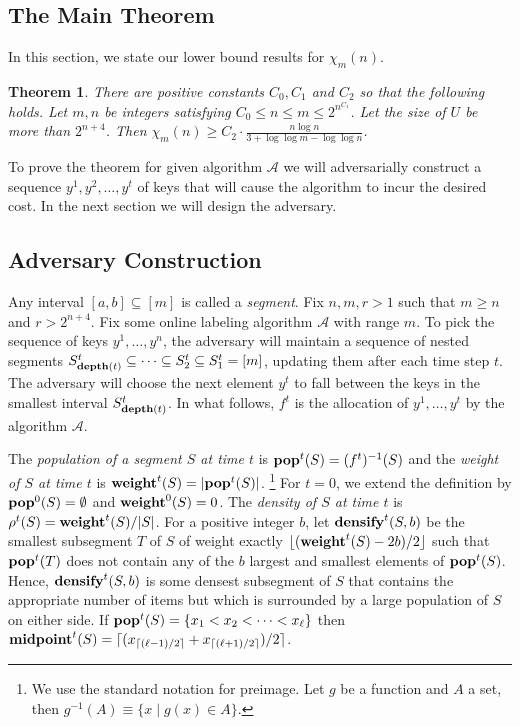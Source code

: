 \documentclass[11pt]{article}
\newtheorem{theorem}{Theorem} %
\newcommand{\A}{\mathcal{A}}
\newcommand{\thmA}{{C_0}}
\newcommand{\thmB}{{C_1}}
\newcommand{\thmC}{{C_2}}
\newcommand{\pop}{{\rm {\bf pop}}}
\newcommand{\weight}{{\rm {\bf weight}}}
\newcommand{\midp}{{\rm {\bf midpoint}}}
\newcommand{\depth}{{\rm {\bf depth}}}
\newcommand{\densify}{{\rm {\bf densify}}}
\begin{document}
\subsection{The Main Theorem}
\label{subsec:main theorem}
In this section, we state our lower bound results for  $\chi_m(n)$.

\begin{theorem}
\label{thm:main}
There are positive constants $\thmA, \thmB$ and $\thmC$ so that the following holds. Let $m,n$ be integers satisfying
$\thmA \leq n \le m \le 2^{n^\thmB}$. Let the size of $U$ be more than $2^{n+4}$.
Then $\chi_m(n) \geq \thmC \cdot \frac{n \log n}{3 + \log \log m - \log \log n}$.
\end{theorem}


To prove the theorem for given algorithm $\A$ we will adversarially construct a sequence $y^1,y^2,\dotsc,y^t$ of keys that will cause
the algorithm to incur the desired cost. In the next section we will design the adversary.

\subsection{Adversary Construction}

Any interval $[a,b]\subseteq [m]$ is called a \emph{segment}. Fix $n,m,r>1$ such that $m\ge n$ and $r>2^{n+4}$.
Fix some online labeling algorithm $\A$ with range $m$.
To pick the sequence of keys $y^1,\dotsc,y^n$, the adversary will maintain a sequence of
nested segments $S^t_{\depth(t)} \subseteq \cdots \subseteq S^t_2 \subseteq S^t_1 = [m]$, updating them after each time step $t$.
The adversary will choose the next element $y^{t}$ to fall between the keys in
the smallest interval $S^t_{\depth(t)}$. In what follows, $f^t$ is the allocation of $y^1,\dotsc,y^t$ by the algorithm $\A$.

The \emph{population of a segment $S$ at time $t$} is $\pop^t(S) = (f^t)^{-1}(S)$ and the
\emph{weight of $S$ at time $t$} is $\weight^t(S) = |\pop^t(S)|$.%
\footnote{We use the standard notation for preimage. Let $g$ be a function and $A$ a set, then $g^{-1}(A) \equiv \{ x \mid g(x) \in A \}$.}
For $t=0$, we extend the definition by $\pop^0(S) = \emptyset$ and $\weight^0(S) = 0$.
The \emph{density of $S$ at time $t$} is $\rho^t(S) = \weight^t(S) / |S|$. For a positive
integer $b$, let $\densify^t(S,b)$ be the smallest subsegment $T$ of $S$ of weight exactly
$\lfloor (\weight^t(S) - 2b) / 2 \rfloor$ such that $\pop^t(T)$ does not contain any of the $b$ largest
and smallest elements of $\pop^t(S)$. Hence, $\densify^t(S,b)$ is some densest subsegment of $S$ that contains
the appropriate number of items but which is surrounded by a large population of $S$ on either side.
If $\pop^t(S)=\{x_1<x_2 <\cdots <x_\ell\}$ then $\midp^t(S)= \lceil (x_{\lceil (\ell-1)/2 \rceil} + x_{\lceil (\ell+1)/2 \rceil} )/ 2 \rceil$.
\end{document}

